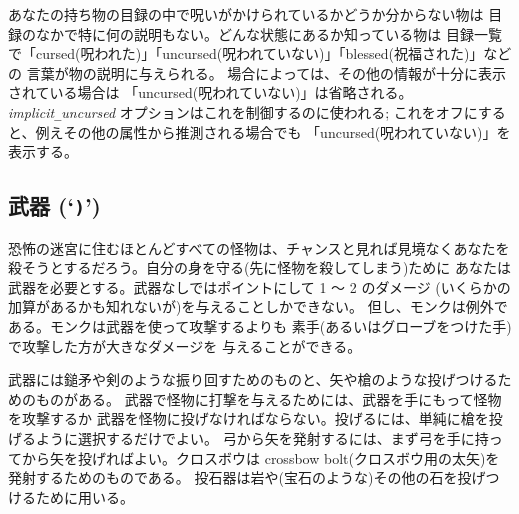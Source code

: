 あなたの持ち物の目録の中で呪いがかけられているかどうか分からない物は
目録のなかで特に何の説明もない。どんな状態にあるか知っている物は
目録一覧で「cursed(呪われた)」「uncursed(呪われていない)」「blessed(祝福された)」などの
言葉が物の説明に与えられる。
場合によっては、その他の情報が十分に表示されている場合は
「uncursed(呪われていない)」は省略される。
{\it implicit\verb+_+uncursed\/}
オプションはこれを制御するのに使われる;
これをオフにすると、例えその他の属性から推測される場合でも
「uncursed(呪われていない)」を表示する。

\subsection*{武器 (`{\tt )}')}

恐怖の迷宮に住むほとんどすべての怪物は、チャンスと見れば見境なくあなたを
殺そうとするだろう。自分の身を守る(先に怪物を殺してしまう)ために
あなたは武器を必要とする。武器なしではポイントにして 1 ～ 2 のダメージ
(いくらかの加算があるかも知れないが)を与えることしかできない。
但し、モンクは例外である。モンクは武器を使って攻撃するよりも
素手(あるいはグローブをつけた手)で攻撃した方が大きなダメージを
与えることができる。

武器には鎚矛や剣のような振り回すためのものと、矢や槍のような投げつけるためのものがある。
武器で怪物に打撃を与えるためには、武器を手にもって怪物を攻撃するか
武器を怪物に投げなければならない。投げるには、単純に槍を投げるように選択するだけでよい。
弓から矢を発射するには、まず弓を手に持ってから矢を投げればよい。クロスボウは
crossbow bolt(クロスボウ用の太矢)を発射するためのものである。
投石器は岩や(宝石のような)その他の石を投げつけるために用いる。

